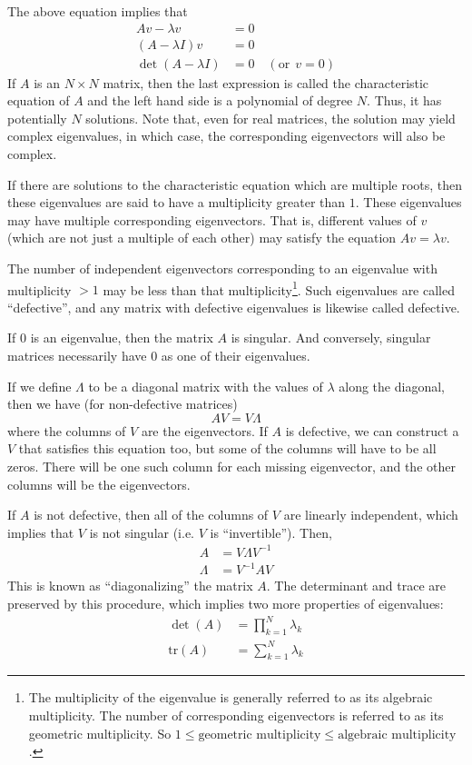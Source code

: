 \documentclass[twoside,letterpaper,11pt]{article}
\begin{document}
The above equation implies that 
\begin{align*}
A v - \lambda v &= 0 \\
(A - \lambda I) v &= 0 \\
\det(A-\lambda I) &= 0 \quad (\text{or} ~~ v = 0)
\end{align*}
If $A$ is an $N \times N$ matrix, then the last expression is called the characteristic
equation of $A$ and the left hand side is a polynomial of degree $N$.
Thus, it has potentially $N$ solutions.  
Note that, even for real matrices, the solution may yield complex eigenvalues, in which
case, the corresponding eigenvectors will also be complex.

If there are solutions to the characteristic equation which are multiple roots, then these
eigenvalues are said to have a multiplicity greater than $1$.  These eigenvalues 
may have multiple corresponding eigenvectors.  That is, different values of $v$ 
(which are not just a multiple of each other) may satisfy the equation $A v = \lambda v$.

The number of independent eigenvectors
corresponding to an eigenvalue with multiplicity $> 1$ may be less than that multiplicity\footnote{
The multiplicity of the eigenvalue is generally referred to as its algebraic multiplicity.
The number of corresponding eigenvectors is referred to as its geometric multiplicity.
So $1 \leq \text{geometric multiplicity} \leq \text{algebraic multiplicity}$.}.  Such eigenvalues
are called ``defective'', and any matrix with defective eigenvalues is likewise
called defective.

If $0$ is an eigenvalue, then the matrix $A$ is singular.
And conversely, singular matrices necessarily have $0$ as one of their eigenvalues.

If we define $\Lambda$ to be a diagonal matrix with the values of $\lambda$ along
the diagonal, then we have (for non-defective matrices)
\begin{equation*}
A V = V \Lambda
\end{equation*}
where the columns of $V$ are the eigenvectors.  If $A$ is defective, we can construct
a $V$ that satisfies this equation too, but some of the columns will have to be all zeros.
There will be one such column for each missing eigenvector, and the other columns will
be the eigenvectors.

If $A$ is not defective, then all of the columns of $V$ are linearly independent, which
implies that $V$ is not singular (i.e. $V$ is ``invertible'').  Then,
\begin{align*}
A &= V \Lambda V^{-1}\\
\Lambda &= V^{-1} A V
\end{align*}
This is known as ``diagonalizing'' the matrix $A$.  The determinant and trace are preserved by this procedure, which implies two more properties of eigenvalues:
\begin{align*}
\det(A) &= \prod_{k=1}^{N} \lambda_k\\
\text{tr}(A) &= \sum_{k=1}^{N} \lambda_k
\end{align*}
\end{document}
